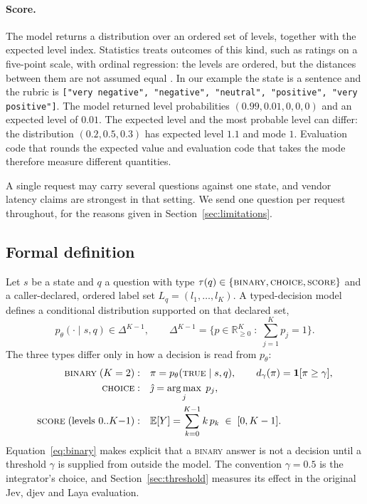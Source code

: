 \paragraph{Score.} The model returns a distribution over an ordered set of
levels, together with the expected level index. Statistics treats outcomes of
this kind, such as ratings on a five-point scale, with ordinal regression: the
levels are ordered, but the distances between them are not assumed equal
\citep{mccullagh1980ordinal}. In our example the state is a sentence
and the rubric is
\texttt{["very negative", "negative", "neutral", "positive", "very positive"]}.
The model returned level probabilities $(0.99, 0.01, 0, 0, 0)$ and an expected
level of $0.01$. The expected level and the most probable level can differ: the
distribution $(0.2, 0.5, 0.3)$ has expected level $1.1$ and mode $1$. Evaluation
code that rounds the expected value and evaluation code that takes the mode
therefore measure different quantities.

A single request may carry several questions against one state, and vendor
latency claims are strongest in that setting. We send one question per request
throughout, for the reasons given in Section~\ref{sec:limitations}.

\subsection{Formal definition}

Let $s$ be a state and $q$ a question with type
$\tau(q) \in \{\textsc{binary}, \textsc{choice}, \textsc{score}\}$ and a
caller-declared, ordered label set $L_q = (l_1, \dots, l_K)$. A typed-decision
model defines a conditional distribution supported on that declared set,
\begin{equation}
  p_\theta(\cdot \mid s, q) \in \Delta^{K-1},
  \qquad
  \Delta^{K-1} = \Big\{ p \in \mathbb{R}^{K}_{\ge 0} \;:\; \textstyle\sum_{j=1}^{K} p_j = 1 \Big\}.
  \label{eq:simplex}
\end{equation}
The three types differ only in how a decision is read from $p_\theta$:
\begin{align}
  \textsc{binary} \; (K=2):&\quad \pi = p_\theta(\textsc{true} \mid s,q), \qquad d_\gamma(\pi) = \mathbf{1}[\pi \ge \gamma], \label{eq:binary}\\
  \textsc{choice}:&\quad \hat\jmath = \operatorname*{arg\,max}_{j} \; p_j, \label{eq:choice}\\
  \textsc{score} \; (\text{levels } 0..K{-}1):&\quad \mathbb{E}[Y] = \sum_{k=0}^{K-1} k \, p_k \;\in\; [0, K-1]. \label{eq:score}
\end{align}
Equation~\eqref{eq:binary} makes explicit that a \textsc{binary} answer is not a
decision until a threshold $\gamma$ is supplied from outside the model. The
convention $\gamma = 0.5$ is the integrator's choice, and
Section~\ref{sec:threshold} measures its effect in the original Jev, djev and
Laya evaluation.

